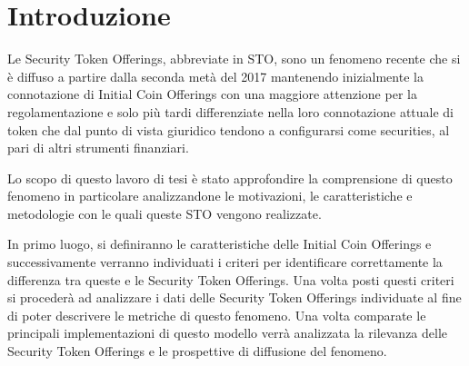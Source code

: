\chapter*{Introduzione}                 %

Le Security Token Offerings, abbreviate in STO, sono un fenomeno recente che si è diffuso a partire dalla seconda metà del 2017 mantenendo inizialmente la connotazione di Initial Coin Offerings con una maggiore attenzione per la regolamentazione e solo più tardi differenziate nella loro connotazione attuale di token che dal punto di vista giuridico tendono a configurarsi come securities, al pari di altri strumenti finanziari.  

Lo scopo di questo lavoro di tesi è stato approfondire la comprensione di questo fenomeno in particolare analizzandone le motivazioni, le caratteristiche e metodologie con le quali queste STO vengono realizzate.

In primo luogo, si definiranno le caratteristiche delle Initial Coin Offerings e successivamente verranno individuati i criteri per identificare correttamente la differenza tra queste e le Security Token Offerings. Una volta posti questi criteri si procederà ad analizzare i dati delle Security Token Offerings individuate al fine di poter descrivere le metriche di questo fenomeno. Una volta comparate le principali implementazioni di questo modello verrà analizzata la rilevanza delle Security Token Offerings e le prospettive di diffusione del fenomeno. 



\clearpage{\pagestyle{empty}\cleardoublepage}